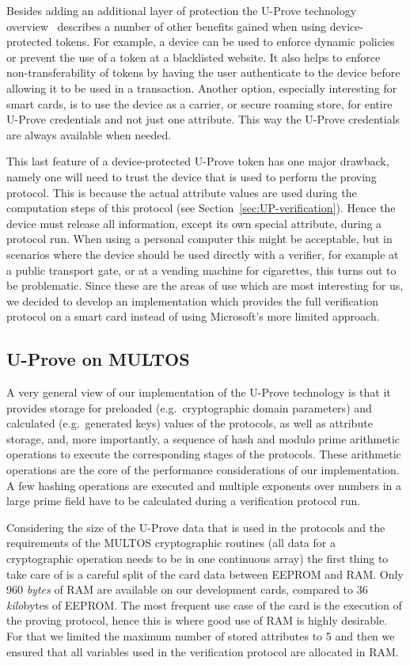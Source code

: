 Besides adding an additional layer of protection the U-Prove technology
overview~\cite{U-Prove_Overview2011} describes a number of other benefits
gained when using device-protected tokens. For example, a device can be used to
enforce dynamic policies or prevent the use of a token at a blacklisted website.
It also helps to enforce non-transferability of tokens by having the user
authenticate to the device before allowing it to be used in a transaction.
Another option, especially interesting for smart cards, is to use the device as
a carrier, or secure roaming store, for entire U-Prove credentials and not just
one attribute. This way the U-Prove credentials are always available when needed.

This last feature of a device-protected U-Prove token has one major drawback,
namely one will need to trust the device that is used to perform the proving
protocol. This is because the actual attribute values are used during the
computation steps of this protocol (see Section~\ref{sec:UP-verification}).
Hence the device must release all information, except its own special attribute,
during a protocol run. When using a personal computer this might be acceptable,
but in scenarios where the device should be used directly with a verifier, for
example at a public transport gate, or at a vending machine for cigarettes, this
turns out to be problematic. Since these are the areas of use which are most
interesting for us, we decided to develop an implementation which provides the
full verification protocol on a smart card instead of using Microsoft's more
limited approach.

\subsection{U-Prove on MULTOS}

A very general view of our implementation of the U-Prove technology is that it
provides storage for preloaded (e.g.\ cryptographic domain parameters) and
calculated (e.g.\ generated keys) values of the protocols, as well as attribute
storage, and, more importantly, a sequence of hash and modulo prime arithmetic
operations to execute the corresponding stages of the protocols. These
arithmetic operations are the core of the performance considerations of our
implementation. A few hashing operations are executed and multiple exponents
over numbers in a large prime field have to be calculated during a verification
protocol run.

Considering the size of the U-Prove data that is used in the protocols and the
requirements of the MULTOS cryptographic routines (all data for a cryptographic
operation needs to be in one continuous array) the first thing to take care of
is a careful split of the card data between EEPROM and RAM. Only 960
\emph{bytes} of RAM are available on our development cards, compared to
36 \emph{kilo}bytes of EEPROM. The most frequent use case of the card is the
execution of the proving protocol, hence this is where good use of RAM is highly
desirable. For that we limited the maximum number of stored attributes to 5 and
then we ensured that all variables used in the verification protocol are
allocated in RAM.

